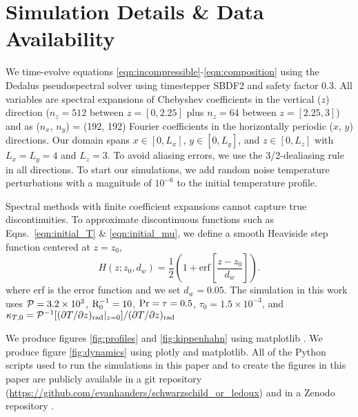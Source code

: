 \section{Simulation Details \& Data Availability}
\label{app:simulation_details}
We time-evolve equations \ref{eqn:incompressible}-\ref{eqn:composition} using the Dedalus pseudospectral solver \citep[git commit 1339061]{burns_etal_2020} using timestepper SBDF2 \citep{wang_ruuth_2008} and safety factor 0.3.
All variables are spectral expansions of Chebyshev coefficients in the vertical ($z$) direction ($n_z = 512$ between $z=[0, 2.25]$ plus $n_z = 64$ between $z=[2.25, 3]$) and as ($n_x$, $n_y$) = (192, 192) Fourier coefficients in the horizontally periodic ($x$, $y$) directions.
Our domain spans $x \in [0, L_x]$, $y \in [0, L_y]$, and $z \in [0, L_z]$ with $L_x = L_y = 4$ and $L_z = 3$.
To avoid aliasing errors, we use the 3/2-dealiasing rule in all directions.
To start our simulations, we add random noise temperature perturbations with a magnitude of $10^{-6}$ to the initial temperature profile.

Spectral methods with finite coefficient expansions cannot capture true discontinuities.
To approximate discontinuous functions such as Eqns.~\ref{eqn:initial_T} \& \ref{eqn:initial_mu}, we define a smooth Heaviside step function centered at $z = z_0$,
\begin{equation}
H(z; z_0, d_w) = \frac{1}{2}\left(1 + \mathrm{erf}\left[\frac{z - z_0}{d_w}\right]\right).
\label{eqn:heaviside}
\end{equation}
where erf is the error function and we set $d_w = 0.05$.
The simulation in this work uses $\mathcal{P} = 3.2 \times 10^3$, $\mathrm{R}_{0}^{-1} = 10$, $\rm{Pr} = \tau = 0.5$, $\tau_0 = 1.5 \times 10^{-3}$, and ${\kappa_{T,0} = \mathcal{P}^{-1}[(\partial T/\partial z)_{\rm{rad}}|_{z=0}] / (\partial T/\partial z)_{\rm{rad}}}$

We produce figures \ref{fig:profiles} and \ref{fig:kippenhahn} using matplotlib \citep{hunter2007, mpl3.3.4}.
We produce figure \ref{fig:dynamics} using plotly \citep{plotly} and matplotlib.
All of the Python scripts used to run the simulations in this paper and to create the figures in this paper are publicly available in a git repository (\url{https://github.com/evanhanders/schwarzschild_or_ledoux}) and in a Zenodo repository \citep{supp}.
